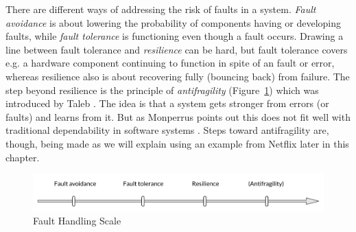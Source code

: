 \noindent There are different ways of addressing the risk of faults in a system. \textit{Fault avoidance} is about lowering the probability of components having or developing faults, while \textit{fault tolerance} is functioning even though a fault occurs. Drawing a line between fault tolerance and \textit{resilience} can be hard, but fault tolerance covers e.g. a hardware component continuing to function in spite of an fault or error, whereas resilience also is about recovering fully (bouncing back) from failure. The step beyond resilience is the principle of \textit{antifragility} (Figure~\ref{fig:fault_handling_scale}) which was introduced by Taleb \cite[p. 1]{monperrus_2014_antifragility}. The idea is that a system gets stronger from errors (or faults) and learns from it. But as Monperrus points out this does not fit well with traditional dependability in software systems \cite[p. 1]{monperrus_2014_antifragility}. Steps toward antifragility are, though, being made as we will explain using an example from Netflix later in this chapter.
 
\begin{figure}
    \centering
    \includegraphics[width=14cm]{figures/fault_scale}
    \caption{Fault Handling Scale}
    \label{fig:fault_handling_scale}
\end{figure}